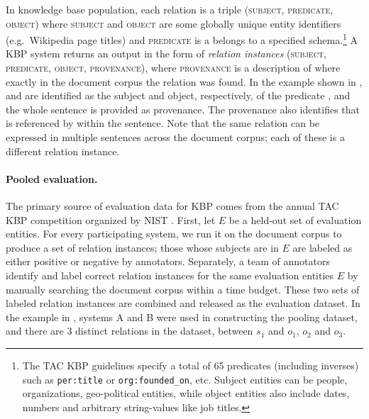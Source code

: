 In knowledge base population,
  each relation is a triple (\textsc{subject}, \textsc{predicate}, \textsc{object}) where \textsc{subject} and \textsc{object} are some globally unique entity identifiers (e.g.\, Wikipedia page titles) and \textsc{predicate} is a belongs to a specified schema.\footnote{%
    The TAC KBP guidelines specify a total of 65 predicates (including inverses) such as 
     \texttt{per:title} or \texttt{org:founded\_on}, etc.
    Subject entities can be people, organizations, geo-political entities, while object entities also include 
    dates, numbers and arbitrary string-values like job titles.
     }
A KBP system returns an output in the form of \textit{relation instances} (\textsc{subject}, \textsc{predicate}, \textsc{object}, \textsc{provenance}), where \textsc{provenance} is a description of where exactly in the document corpus the relation was found. 
In the example shown in ,
 and  are identified as the subject and object, respectively, of the predicate , and the whole sentence is provided as provenance.
The provenance also identifies that  is referenced by  within the sentence.
Note that the same relation can be expressed in multiple sentences across the document corpus; each of these is a different relation instance.

\paragraph{Pooled evaluation.}

The primary source of evaluation data for KBP comes from the annual TAC KBP competition organized by NIST \citep{ji2011kbp}.
First, let $E$ be a held-out set of evaluation entities.
For every participating system, we run it on the document corpus to produce a set of relation instances;
those whose subjects are in $E$ are labeled as either positive or negative by annotators.
Separately, a team of annotators identify and label correct relation instances for the same evaluation entities $E$ by manually searching the document corpus within a time budget.
These two sets of labeled relation instances are combined and released as the evaluation dataset.
In the example in , systems A and B were used in constructing the pooling dataset, and there are 3 distinct relations in the dataset, between $s_1$ and $o_1$, $o_2$ and $o_3$.

